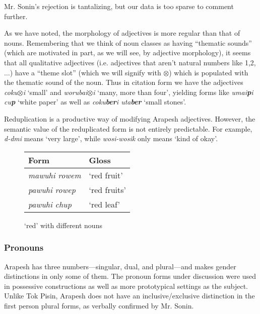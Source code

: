 \documentclass[pdftex,12pt,letterpaper]{article}
\let\ipa\textipa
\begin{document}
 \noindent Mr. Sonin's rejection is tantalizing, but our data is too sparse to comment further.

 As we have noted, the morphology of adjectives is more regular than that of nouns. Remembering that we think of noun classes as having ``thematic sounds'' (which are motivated in part, as we will see, by adjective morphology), it seems that all qualitative adjectives (i.e. adjectives that aren't natural numbers like 1,2,$\ldots$) have a ``theme slot'' (which we will signify with $\otimes$) which is populated with the thematic sound of the noun. Thus in citation form we have the adjectives \emph{coku$\otimes$i} `small' and \emph{worubai$\otimes$i} `many, more than four', yielding forms like \emph{umai\textbf{p}i cu\textbf{p}} `white paper' as well as \emph{coku\textbf{ber}i uta\textbf{ber}} `small stones'.
 
 Reduplication is a productive way of modifying Arapesh adjectives. However, the semantic value of the reduplicated form is not entirely predictable. For example, \emph{d\ipa{1be}-d\ipa{1be}mi} means `very large', while \emph{wosi-wosik} only means `kind of okay'.

 \begin{figure}[t]
 \begin{center}
 \def\arraystretch{1.4}
 \begin{tabular}{| l | l |}\hline
 Form & Gloss \\\hline
 \emph{mawuhi rowem} & `red fruit' \\\hline
 \emph{pawuhi rowep} & `red fruits' \\\hline
 \emph{pawuhi chup} & `red leaf' \\\hline

 \end{tabular}
 \end{center}
 \caption{`red' with different nouns}
 \end{figure}

 \subsubsection{Pronouns}

 Arapesh has three numbers---singular, dual, and plural---and makes gender distinctions in only some of them. The pronoun forms under discussion were used in possessive constructions as well as more prototypical settings as the subject. Unlike Tok Pisin, Arapesh does not have an inclusive/exclusive distinction in the first person plural forms, as verbally confirmed by Mr. Sonin.
 
\end{document}
